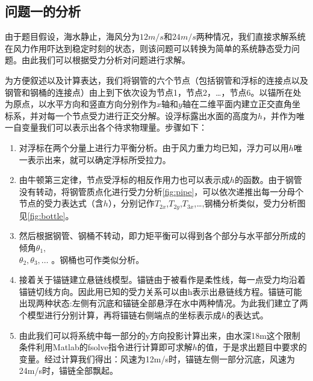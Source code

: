 \documentclass{cumcm}
\begin{document}
\subsection{问题一的分析}
由于题目假设，海水静止，海风分为$12m/s$和$24m/s$两种情况，我们直接求解系统在风力作用吓达到稳定时刻的状态，则该问题可以转换为简单的系统静态受力问题。由此我们可以根据受力分析对问题进行求解。\par
为方便叙述以及计算表达，我们将钢管的六个节点（包括钢管和浮标的连接点以及钢管和钢桶的连接点）由上到下依次设为节点1，节点2，\dots，节点6。以锚所在处为原点，以水平方向和竖直方向分别作为$x$轴和$y$轴在二维平面内建立正交直角坐标系，并对每一个节点受力进行正交分解。设浮标露出水面的高度为$h$，并作为唯一自变量我们可以表示出各个待求物理量。步骤如下：
\begin{enumerate}
	\item 对浮标在两个分量上进行力平衡分析。由于风力重力均已知，浮力可以用$h$唯一表示出来，就可以确定浮标所受拉力。
	\item
	由牛顿第三定律，节点受浮标的相反作用力也可以表示成$h$的函数。由于钢管没有转动，将钢管质点化进行受力分析\ref{fig:pipe}，可以依次递推出每一分母个节点的受力表达式（含$h$），分别记作$T_{2x}$,$T_{2y}$,$T_{3x}$,\dots,钢桶分析类似，受力分析图见\ref{fig:bottle}。
	\item
	然后根据钢管、钢桶不转动，即力矩平衡\cite{physics}可以得到各个部分与水平部分所成的倾角$\theta_1$,\\$\theta_2,\theta_3,\dots$ 。钢桶也可作类似分析。
	\item
	接着关于锚链建立悬链线模型。锚链由于被看作是柔性线，每一点受力均沿着锚链切线方向。因此用已知的受力关系可以由h表示出悬链线方程。锚链可能出现两种状态:左侧有沉底和锚链全部悬浮在水中两种情况。为此我们建立了两个模型进行分别计算，再将锚链右侧端点的坐标表示成$h$的表达式。
	\item
	由此我们可以将系统中每一部分的y方向投影计算出来，由水深18m这个限制条件利用Matlab的fsolve指令进行计算即可求解$h$的值，于是求出题目中要求的变量。经过计算我们得出：风速为12m/s时，锚链左侧一部分沉底，风速为24m/s时，锚链全部飘起。
\end{enumerate}
\end{document}
